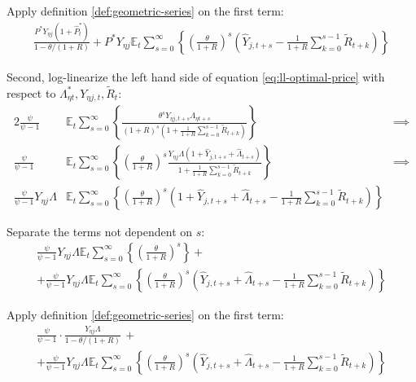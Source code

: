 \documentclass[
	12pt,
	]{article}
\numberwithin{equation}{section}
\newcommand{\E}[1][t]{{\mathbb{E}_{#1}}}
\theoremstyle{definition}
\theoremstyle{plain}
\theoremstyle{plain}
\theoremstyle{plain}
\begin{document}
Apply definition \ref{def:geometric-series} on the first term:
\begin{align}
	\frac{ P^\ast Y_{\eta j} ( 1 + \hat{P}_t^\ast ) }{1-\theta /(1+R)} + P^\ast Y_{\eta j} \E \sum_{s=0}^{\infty} \left\{ \left( \frac{\theta}{1 + R} \right)^s \left( \hat{Y}_{j,t+s} - \frac{1}{1 + R} \sum_{k=0}^{s-1} \widetilde{R}_{t+k} \right) \right\} \nonumber
\end{align}

Second, log-linearize the left hand side of equation \ref{eq:ll-optimal-price} with respect to \( \Lambda_{\eta t}^\ast, Y_{\eta j,t}, \widetilde{R}_t \):
\begin{alignat}{2}
	\frac{\psi}{\psi-1} &\E \sum_{s=0}^{\infty} \left\{ \frac{\theta^s Y_{\eta j,t+s} \Lambda_{\eta t+s}}{ (1 + R)^s \left( 1 + \frac{1}{1 + R} \sum_{k=0}^{s-1} \widetilde{R}_{t+k} \right) } \right\} & \implies \nonumber \\
	\frac{\psi}{\psi-1} &\E \sum_{s=0}^{\infty} \left\{ \left( \frac{\theta}{1 + R} \right)^s \frac{ Y_{\eta j} \Lambda (1+ \hat{Y}_{j,t+s} + \hat{\Lambda}_{t+s}) }{ 1 + \frac{1}{1 + R} \sum_{k=0}^{s-1} \widetilde{R}_{t+k} } \right\} & \implies \nonumber \\
	\frac{\psi}{\psi-1} Y_{\eta j} \Lambda &\E \sum_{s=0}^{\infty} \left\{ \left( \frac{\theta}{1 + R} \right)^s \left( 1+ \hat{Y}_{j,t+s} + \hat{\Lambda}_{t+s} - \frac{1}{1 + R} \sum_{k=0}^{s-1} \widetilde{R}_{t+k} \right) \right\} & \nonumber
\end{alignat}

Separate the terms not dependent on $s$:
\begin{multline}
	\frac{\psi}{\psi-1} Y_{\eta j} \Lambda \E \sum_{s=0}^{\infty} \left\{ \left( \frac{\theta}{1 + R} \right)^s \right\} + 
	\\
	+ \frac{\psi}{\psi-1} Y_{\eta j} \Lambda \E \sum_{s=0}^{\infty} \left\{ \left( \frac{\theta}{1 + R} \right)^s \left( \hat{Y}_{j,t+s} + \hat{\Lambda}_{t+s} - \frac{1}{1 + R} \sum_{k=0}^{s-1} \widetilde{R}_{t+k} \right) \right\} \nonumber
\end{multline}

Apply definition \ref{def:geometric-series} on the first term:
\begin{multline}
	\frac{\psi}{\psi-1} \cdot \frac{Y_{\eta j} \Lambda}{1-\theta /(1+R)} \, + 
	\\
	+ \frac{\psi}{\psi-1} Y_{\eta j} \Lambda \E \sum_{s=0}^{\infty} \left\{ \left( \frac{\theta}{1 + R} \right)^s \left( \hat{Y}_{j,t+s} + \hat{\Lambda}_{t+s} - \frac{1}{1 + R} \sum_{k=0}^{s-1} \widetilde{R}_{t+k} \right) \right\} \nonumber
\end{multline}
\end{document}

